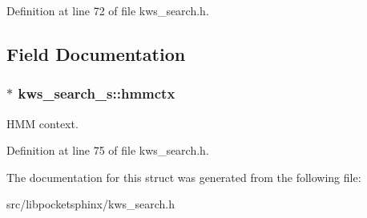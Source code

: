 Definition at line 72 of file kws\-\_\-search.\-h.



\subsection{Field Documentation}
\subsubsection[{hmmctx}]{$\ast$ kws\-\_\-search\-\_\-s\-::hmmctx}\label{structkws__search__s_a0069d57702f921cbd1e2093148e7b672}


H\-M\-M context. 



Definition at line 75 of file kws\-\_\-search.\-h.



The documentation for this struct was generated from the following file\-:\begin{DoxyCompactItemize}
\item 
src/libpocketsphinx/kws\-\_\-search.\-h\end{DoxyCompactItemize}
